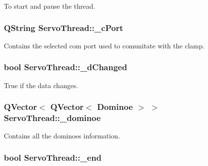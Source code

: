 To start and pause the thread. 

\hypertarget{a00009_ab52437b31a433c427a6c050f2b1cc959}{}
\subsubsection[{\+\_\+c\+Port}]{\setlength{\rightskip}{0pt plus 5cm}Q\+String Servo\+Thread\+::\+\_\+c\+Port\hspace{0.3cm}{\ttfamily [private]}}\label{a00009_ab52437b31a433c427a6c050f2b1cc959}


Contains the selected com port used to comunitate with the clamp. 

\hypertarget{a00009_a2b6ccfeacbb3cc9ac5c34549b9aa3f11}{}
\subsubsection[{\+\_\+d\+Changed}]{\setlength{\rightskip}{0pt plus 5cm}bool Servo\+Thread\+::\+\_\+d\+Changed\hspace{0.3cm}{\ttfamily [private]}}\label{a00009_a2b6ccfeacbb3cc9ac5c34549b9aa3f11}


True if the data changes. 

\hypertarget{a00009_ad06a87d9f22914fd2597c939a3eb61cd}{}
\subsubsection[{\+\_\+dominoe}]{\setlength{\rightskip}{0pt plus 5cm}Q\+Vector$<$ Q\+Vector$<$ {\bf Dominoe} $>$ $>$ Servo\+Thread\+::\+\_\+dominoe\hspace{0.3cm}{\ttfamily [private]}}\label{a00009_ad06a87d9f22914fd2597c939a3eb61cd}


Contains all the dominoes information. 

\hypertarget{a00009_acca9896d1a2d1ef68527e6834f81c76c}{}
\subsubsection[{\+\_\+end}]{\setlength{\rightskip}{0pt plus 5cm}bool Servo\+Thread\+::\+\_\+end\hspace{0.3cm}{\ttfamily [private]}}\label{a00009_acca9896d1a2d1ef68527e6834f81c76c}


